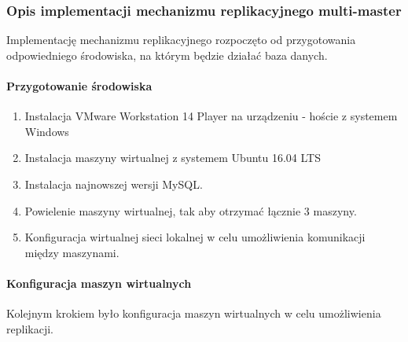\documentclass[]{article}
\let\oldparagraph\paragraph
\renewcommand{\paragraph}[1]{\oldparagraph{#1}\mbox{}}
\begin{document}
\hypertarget{header-n26}{%
\subsubsection{Opis implementacji mechanizmu replikacyjnego
multi-master}\label{header-n26}}

Implementację mechanizmu replikacyjnego rozpoczęto od przygotowania
odpowiedniego środowiska, na którym będzie działać baza danych.

\hypertarget{header-n29}{%
\paragraph{Przygotowanie środowiska}\label{header-n29}}

\begin{enumerate}
\def\labelenumi{\arabic{enumi}.}
\item
  Instalacja VMware Workstation 14 Player na urządzeniu - hoście z
  systemem Windows
\item
  Instalacja maszyny wirtualnej z systemem Ubuntu 16.04 LTS
\item
  Instalacja najnowszej wersji MySQL.
\item
  Powielenie maszyny wirtualnej, tak aby otrzymać łącznie 3 maszyny.
\item
  Konfiguracja wirtualnej sieci lokalnej w celu umożliwienia komunikacji
  między maszynami. 
\end{enumerate}

\hypertarget{header-n46}{%
\paragraph{Konfiguracja maszyn wirtualnych}\label{header-n46}}

Kolejnym krokiem było konfiguracja maszyn wirtualnych w celu
umożliwienia replikacji.
\end{document}
